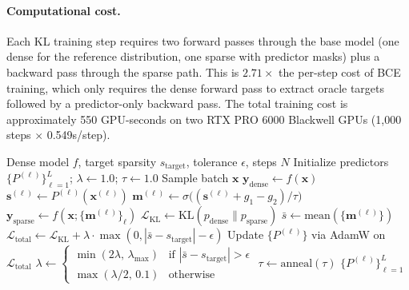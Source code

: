 \paragraph{Computational cost.}
Each KL training step requires two forward passes through the base model (one dense for the reference distribution, one sparse with predictor masks) plus a backward pass through the sparse path.
This is $2.71\times$ the per-step cost of BCE training, which only requires the dense forward pass to extract oracle targets followed by a predictor-only backward pass.
The total training cost is approximately 550 GPU-seconds on two RTX PRO 6000 Blackwell GPUs (1{,}000 steps $\times$ 0.549s/step).

\begin{algorithm}[t]
\caption{KL-Distilled Sparsity Predictor Training}
\label{alg:training}
\begin{algorithmic}[1]
\REQUIRE Dense model $f$, target sparsity $s_{\text{target}}$, tolerance $\epsilon$, steps $N$
\STATE Initialize predictors $\{P^{(\ell)}\}_{\ell=1}^{L}$; $\lambda \leftarrow 1.0$; $\tau \leftarrow 1.0$
    \STATE Sample batch $\mathbf{x}$
    \STATE $\mathbf{y}_{\text{dense}} \leftarrow f(\mathbf{x})$ \hfill {}
        \STATE $\mathbf{s}^{(\ell)} \leftarrow P^{(\ell)}(\mathbf{x}^{(\ell)})$
        \STATE $\mathbf{m}^{(\ell)} \leftarrow \sigma\!\bigl((\mathbf{s}^{(\ell)} + g_1 - g_2)/\tau\bigr)$ \hfill {}
    \ENDFOR
    \STATE $\mathbf{y}_{\text{sparse}} \leftarrow f(\mathbf{x}; \{\mathbf{m}^{(\ell)}\}_\ell)$ \hfill {}
    \STATE $\mathcal{L}_{\text{KL}} \leftarrow \text{KL}(p_{\text{dense}} \| p_{\text{sparse}})$
    \STATE $\bar{s} \leftarrow \text{mean}(\{\mathbf{m}^{(\ell)}\})$
    \STATE $\mathcal{L}_{\text{total}} \leftarrow \mathcal{L}_{\text{KL}} + \lambda \cdot \max(0, |\bar{s} - s_{\text{target}}| - \epsilon)$
    \STATE Update $\{P^{(\ell)}\}$ via AdamW on $\mathcal{L}_{\text{total}}$
        \STATE $\lambda \leftarrow \begin{cases} \min(2\lambda,\, \lambda_{\max}) & \text{if } |\bar{s} - s_{\text{target}}| > \epsilon \\ \max(\lambda/2,\, 0.1) & \text{otherwise}\end{cases}$
    \ENDIF
    \STATE $\tau \leftarrow \text{anneal}(\tau)$ \hfill {}
\ENDFOR
\RETURN $\{P^{(\ell)}\}_{\ell=1}^{L}$
\end{algorithmic}
\end{algorithm}
